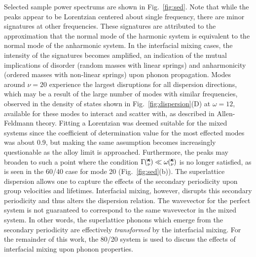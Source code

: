\documentclass[aps,prb,preprint,preprintnumbers,amsmath,amssymb,floatfix,superscriptaddress]{revtex4}
\newcommand{\kv}{\mspace{-4.0mu}\left(\mspace{-8.0mu}
\begin{smallmatrix}&\pmb{\kappa} \\&\nu\end{smallmatrix}
\mspace{-3.0mu}\right)}
\begin{document}
Selected sample power spectrums are shown in Fig.~\ref{fig:sed}. Note that while the peaks appear to be Lorentzian centered about single frequency, there are minor signatures at other frequencies. These signatures are attributed to the approximation that the normal mode of the harmonic system is equivalent to the normal mode of the anharmonic system. In the interfacial mixing cases, the intensity of the signatures becomes amplified, an indication of the mutual implications of disorder (random masses with linear springs) and anharmonicity (ordered masses with non-linear springs) upon phonon propagation. \cite{RevModPhys.53.175}  Modes around $\nu=20$ experience the largest disruptions for all dispersion directions, which may be a result of the large number of modes with similar frequencies, observed in the density of states shown in Fig.~\ref{fig:dispersion}(D) at $\omega=12$, available for these modes to interact and scatter with, as described in Allen-Feldmann theory.\cite{allen_thermal_1993,feldman_thermal_1993-1} Fitting a Lorentzian was deemed suitable for the mixed systems since the coefficient of determination value \cite{Cowpe20081066} for the most effected modes was about 0.9, but making the same assumption becomes increasingly questionable as the alloy limit is approached. \cite{jason2013vc}  Furthermore, the peaks may broaden to such a point where the condition $\Gamma\kv \ll \omega\kv$ is no longer satisfied, as is seen in the 60/40 case for mode 20 (Fig.~\ref{fig:sed}(b)). The superlattice dispersion allows one to capture the effects of the secondary periodicity upon group velocities and lifetimes. Interfacial mixing, however, disrupts this secondary periodicity and thus alters the dispersion relation. The wavevector for the perfect system is not guaranteed to  correspond to the same wavevector in the mixed system. In other words, the superlattice phonons which emerge from the secondary periodicity are effectively \textit{transformed} by the interfacial mixing. For the remainder of this work, the 80/20 system is used to discuss the effects of interfacial mixing upon phonon properties.
\renewcommand{\topfraction}{1.0}
\begin{figure*}%
\begin{center}
\renewcommand{\figure}{Fig.}
\caption{(Colour online) Plots of the power spectrums for the selected modes as indicated by the red square markers in Fig.~\ref{fig:dispersion}(A-C). Dark blue corresponds to a superlattice without mixing, red corresponds to mixing of 80/20 and light blue corresponds to mixing of 60/40. Lifetimes calculated from the fitting of the Lorentzian functions (not shown) for the three systems are presented.}
\label{fig:sed}
\end{center}
\end{figure*}
\end{document}
